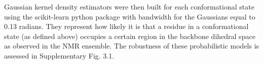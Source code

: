 
Gaussian kernel density estimators were then built for each conformational state using the scikit-learn python package with bandwidth for the Gaussians equal to 0.13 radians. They represent how likely it is that a residue in a conformational state (as defined above) occupies a certain region in the backbone dihedral space as observed in the NMR ensemble. The robustness of these probabilistic models is assessed in Supplementary Fig. 3.1. %

